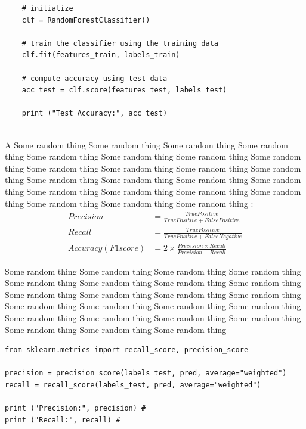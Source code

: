 \begin{verbatim}
	# initialize
	clf = RandomForestClassifier()
	
	# train the classifier using the training data
	clf.fit(features_train, labels_train)
	
	# compute accuracy using test data
	acc_test = clf.score(features_test, labels_test)
	
	print ("Test Accuracy:", acc_test)
	
\end{verbatim}
A Some random thing Some random thing Some random thing Some random thing Some random thing Some random thing Some random thing Some random thing Some random thing Some random thing Some random thing Some random thing Some random thing Some random thing Some random thing Some random thing Some random thing Some random thing Some random thing Some random thing Some random thing Some random thing Some random thing  :
\begin{align}
	Precision &= \frac{True Positive}{True Positive+False Positive} \\
	Recall &= \frac{True Positive}{True Positive + False Negative} \\
	Accuracy(F1 score) &= 2 \times\frac{Precesion\times Recall}{Precision+Recall}
\end{align}

Some random thing Some random thing Some random thing Some random thing Some random thing Some random thing Some random thing Some random thing Some random thing Some random thing Some random thing Some random thing Some random thing Some random thing Some random thing Some random thing Some random thing Some random thing Some random thing Some random thing Some random thing Some random thing Some random thing  
\begin{verbatim}
from sklearn.metrics import recall_score, precision_score

precision = precision_score(labels_test, pred, average="weighted")
recall = recall_score(labels_test, pred, average="weighted")

print ("Precision:", precision) # 
print ("Recall:", recall) # 

\end{verbatim}


